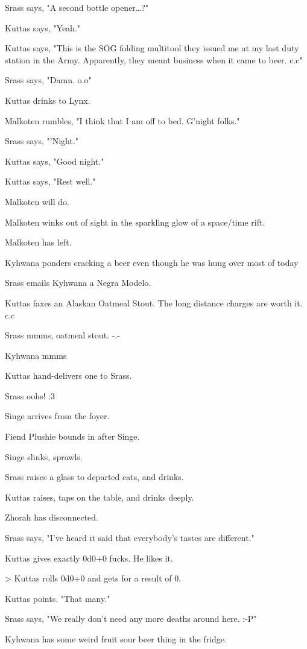 \begin{hangparas}{2em}{1}
Srass says, "A second bottle opener\ldots{}?"

Kuttas says, "Yeah."

Kuttas says, "This is the SOG folding multitool they issued me at my last duty station in the Army. Apparently, they meant business when it came to beer. c.c"

Srass says, "Damn. o.o"

Kuttas drinks to Lynx.

Malkoten rumbles, "I think that I am off to bed.  G'night folks."

Srass says, "'Night."

Kuttas says, "Good night."

Kuttas says, "Rest well."

Malkoten will do.

Malkoten winks out of sight in the sparkling glow of a space/time rift.

Malkoten has left.

Kyhwana ponders cracking a beer even though he was hung over most of today

Srass emails Kyhwana a Negra Modelo.

Kuttas faxes an Alaskan Oatmeal Stout. The long distance charges are worth it. c.c

Srass mmms, oatmeal stout. -.-

Kyhwana mmms

Kuttas hand-delivers one to Srass.

Srass oohs! :3

Singe arrives from the foyer.

Fiend Plushie bounds in after Singe.

Singe slinks, sprawls.

Srass raises a glass to departed cats, and drinks.

Kuttas raises, taps on the table, and drinks deeply.

Zhorah has disconnected.

Srass says, "I've heard it said that everybody's tastes are different."

Kuttas gives exactly 0d0+0 fucks. He likes it.

> Kuttas rolls 0d0+0 and gets for a result of 0.

Kuttas points. "That many."

Srass says, "We really don't need any more deaths around here. :-P"

Kyhwana has some weird fruit sour beer thing in the fridge.


\end{hangparas}
